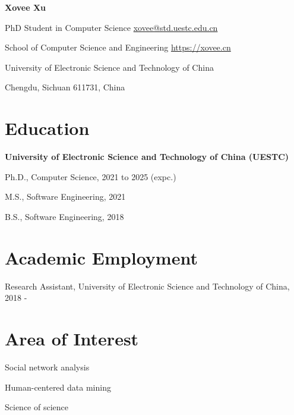 \documentclass{article}
\begin{document}
\begin{center}
    \vspace*{10pt}
    \Huge{
    \textbf{Xovee Xu}}
\end{center}
\vspace{15pt}

\setlength{\parskip}{1pt}

\noindent PhD Student in Computer Science \hfill \href{mailto:xovee@std.uestc.edu.cn}{xovee@std.uestc.edu.cn}

\noindent School of Computer Science and Engineering \hfill \url{https://xovee.cn}

\noindent University of Electronic Science and Technology of China

\noindent Chengdu, Sichuan 611731, China


\setlength{\parskip}{3pt}

\section*{Education}
\indent 

\textbf{University of Electronic Science and Technology of China (UESTC)}

\hspace{2em}Ph.D., Computer Science, 2021 to 2025 (expc.)

\hspace{2em}M.S., Software Engineering, 2021

\hspace{2em}B.S., Software Engineering, 2018

\section*{Academic Employment}
\indent

Research Assistant, University of Electronic Science and Technology of China, 2018 -



\section*{Area of Interest}
\indent

Social network analysis

Human-centered data mining

Science of science


\end{document}
